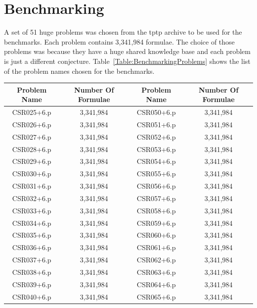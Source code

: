 \chapter{Benchmarking}

A set of 51 huge problems was chosen from the \ac{tptp} archive to be used for the benchmarks. Each problem contains 3,341,984 formulae. The choice of those problems was because they have a huge shared knowledge base and each problem is just a different conjecture. Table~\ref{Table:BenchmarkingProblems} shows the list of the problem names chosen for the benchmarks.
\begin{table}[ht]
  \begin{center}
    \begin{tabular}{c|c||c|c}
      \toprule
      Problem Name & Number Of Formulae & Problem Name & Number Of Formulae \\
      \midrule
      CSR025+6.p   & 3,341,984          & CSR050+6.p   & 3,341,984 \\
      CSR026+6.p   & 3,341,984          & CSR051+6.p   & 3,341,984 \\
      CSR027+6.p   & 3,341,984          & CSR052+6.p   & 3,341,984 \\
      CSR028+6.p   & 3,341,984          & CSR053+6.p   & 3,341,984 \\
      CSR029+6.p   & 3,341,984          & CSR054+6.p   & 3,341,984 \\
      CSR030+6.p   & 3,341,984          & CSR055+6.p   & 3,341,984 \\
      CSR031+6.p   & 3,341,984          & CSR056+6.p   & 3,341,984 \\
      CSR032+6.p   & 3,341,984          & CSR057+6.p   & 3,341,984 \\
      CSR033+6.p   & 3,341,984          & CSR058+6.p   & 3,341,984 \\
      CSR034+6.p   & 3,341,984          & CSR059+6.p   & 3,341,984 \\
      CSR035+6.p   & 3,341,984          & CSR060+6.p   & 3,341,984 \\
      CSR036+6.p   & 3,341,984          & CSR061+6.p   & 3,341,984 \\
      CSR037+6.p   & 3,341,984          & CSR062+6.p   & 3,341,984 \\
      CSR038+6.p   & 3,341,984          & CSR063+6.p   & 3,341,984 \\
      CSR039+6.p   & 3,341,984          & CSR064+6.p   & 3,341,984 \\
      CSR040+6.p   & 3,341,984          & CSR065+6.p   & 3,341,984 \\

\end{tabular}
\end{center}
\end{table}
